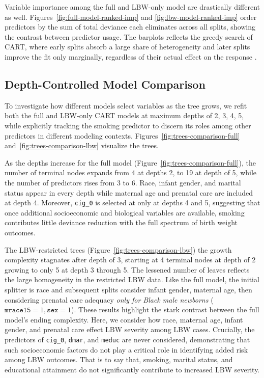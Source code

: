 Variable importance among the full and LBW-only model are drastically different as well. Figures~\ref{fig:full-model-ranked-imp} and \ref{fig:lbw-model-ranked-imp} order predictors by the sum of total deviance each eliminates across all splits, showing the contrast between predictor usage. The barplots reflects the greedy search of CART, where early splits absorb a large share of heterogeneity and later splits improve the fit only marginally, regardless of their actual effect on the response \parencite{cart_greedy}.   

\subsection{Depth-Controlled Model Comparison}
\label{sec:ch3-comparison-depth}

To investigate how different models select variables as the tree grows, we refit both the full and LBW-only CART models at maximum depths of 2, 3, 4, 5, while explicitly tracking the smoking predictor to discern its roles among other predictors in different modeling contexts. Figures~\ref{fig:trees-comparison-full} and~\ref{fig:trees-comparison-lbw} visualize the trees.

As the depths increase for the full model (Figure~\ref{fig:trees-comparison-full}), the number of terminal nodes expands from 4 at depths 2, to 19 at depth of 5, while the number of predictors rises from 3 to 6. Race, infant gender, and marital status appear in every depth while maternal age and prenatal care are included at depth 4. Moreover,  \texttt{cig\_0} is selected at only at depths 4 and 5, suggesting that once additional socioeconomic and biological variables are available, smoking contributes little deviance reduction with the full spectrum of birth weight outcomes. 

The LBW-restricted trees (Figure~\ref{fig:trees-comparison-lbw}) the growth complexity stagnates after depth of 3, starting at 4 terminal nodes at depth of 2 growing to only 5 at depth 3 through 5. The lessened number of leaves reflects the large homogeneity in the restricted LBW data. Like the full model, the initial splitter is race and subsequent splits consider infant gender, maternal age, then considering prenatal care adequacy \emph{only for Black male newborns} (\(\texttt{mrace15} = 1, \texttt{sex}=1\)). These results highlight the stark contrast between the full model's ending complexity. Here, we consider how race, maternal age, infant gender, and prenatal care effect LBW severity among LBW cases. Crucially, the predictors of \texttt{cig\_0}, \texttt{dmar}, and \texttt{meduc} are never considered, demonstrating that such socioeconomic factors do not play a critical role in identifying added risk among LBW outcomes. That is to say that, smoking, marital status, and educational attainment do not significantly contribute to increased LBW severity.

